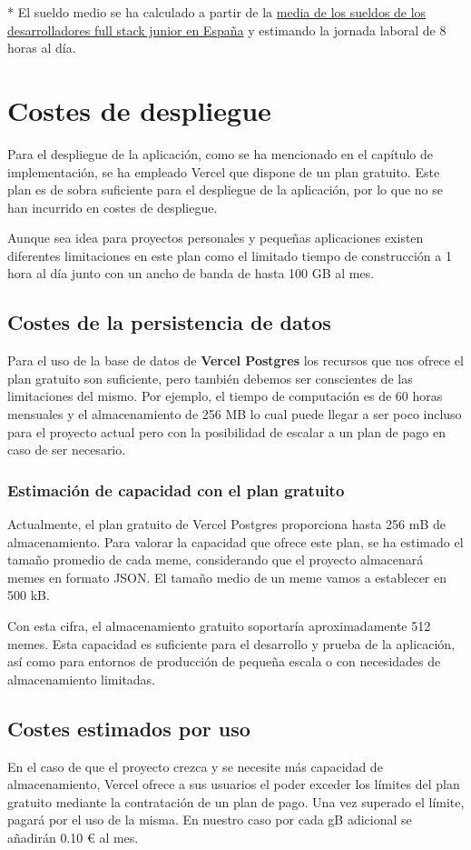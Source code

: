 * El sueldo medio se ha calculado a partir de la \href{https://www.glassdoor.es/Sueldos/desarrollador-full-stack-junior-sueldo-SRCH_KO0,31.htm}{media de los sueldos de los desarrolladores full stack junior en España} y estimando la jornada laboral de 8 horas al día.

\section{Costes de despliegue}

Para el despliegue de la aplicación, como se ha mencionado en el capítulo de implementación, se ha empleado Vercel que dispone de un plan gratuito. Este plan es de sobra suficiente para el despliegue de la aplicación, por lo que no se han incurrido en costes de despliegue.

Aunque sea idea para proyectos personales y pequeñas aplicaciones existen diferentes limitaciones en este plan como el limitado tiempo de construcción a 1 hora al día junto con un ancho de banda de hasta 100 GB al mes.

\subsection{Costes de la persistencia de datos}

Para el uso de la base de datos de \textbf{Vercel Postgres} los recursos que nos ofrece el plan gratuito son suficiente, pero también debemos ser conscientes de las limitaciones del mismo. Por ejemplo, el tiempo de computación es de 60 horas mensuales y el almacenamiento de 256 MB lo cual puede llegar a ser poco incluso para el proyecto actual pero con la posibilidad de escalar a un plan de pago en caso de ser necesario.

\subsubsection{Estimación de capacidad con el plan gratuito}

Actualmente, el plan gratuito de Vercel Postgres proporciona hasta 256 mB de almacenamiento. Para valorar la capacidad que ofrece este plan, se ha estimado el tamaño promedio de cada meme, considerando que el proyecto almacenará memes en formato JSON. El tamaño medio de un meme vamos a establecer en 500 kB.

Con esta cifra, el almacenamiento gratuito soportaría aproximadamente 512 memes. Esta capacidad es suficiente para el desarrollo y prueba de la aplicación, así como para entornos de producción de pequeña escala o con necesidades de almacenamiento limitadas.

\subsection{Costes estimados por uso}

En el caso de que el proyecto crezca y se necesite más capacidad de almacenamiento, Vercel ofrece a sus usuarios el poder exceder los límites del plan gratuito mediante la contratación de un plan de pago. Una vez superado el límite, pagará por el uso de la misma. En nuestro caso por cada gB adicional se añadirán 0.10 € al mes.
